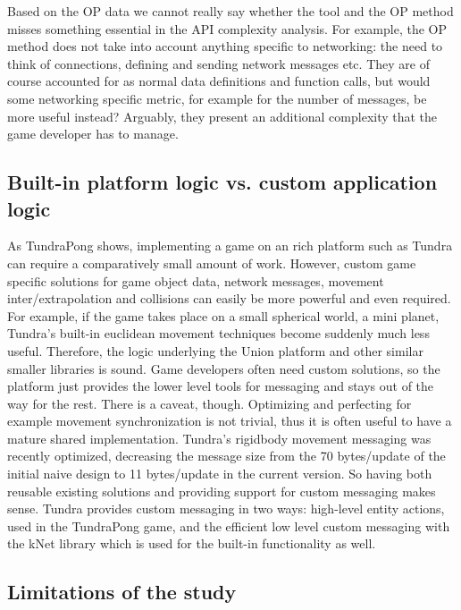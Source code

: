 \documentclass[conference]{IEEEtran}
\begin{document}
Based on the OP data we cannot really say whether the tool and the OP
method misses something essential in the API complexity analysis. For
example, the OP method does not take into account anything specific to
networking: the need to think of connections, defining and sending
network messages etc. They are of course accounted for as normal data
definitions and function calls, but would some networking specific
metric, for example for the number of messages, be more useful
instead? Arguably, they present an additional complexity that the game
developer has to manage.


\subsection{Built-in platform logic vs. custom application logic%
  \label{built-in-platform-logic-vs-custom-application-logic}%
}

As TundraPong shows, implementing a game on an rich platform such as
Tundra can require a comparatively small amount of work. However,
custom game specific solutions for game object data, network messages,
movement inter/extrapolation and collisions can easily be more
powerful and even required. For example, if the game takes place on a
small spherical world, a mini planet, Tundra’s built-in euclidean
movement techniques become suddenly much less useful. Therefore, the
logic underlying the Union platform and other similar smaller
libraries is sound. Game developers often need custom solutions, so
the platform just provides the lower level tools for messaging and
stays out of the way for the rest. There is a caveat,
though. Optimizing and perfecting for example movement synchronization
is not trivial, thus it is often useful to have a mature shared
implementation. Tundra’s rigidbody movement messaging was recently
optimized, decreasing the message size from the 70 bytes/update of the
initial naive design to 11 bytes/update in the current version. So
having both reusable existing solutions and providing support for
custom messaging makes sense.  Tundra provides custom messaging in two
ways: high-level entity actions, used in the TundraPong game, and the
efficient low level custom messaging with the kNet library which is
used for the built-in functionality as well.

\subsection{Limitations of the study%
  \label{limitations-of-the-study}%
}
\end{document}
